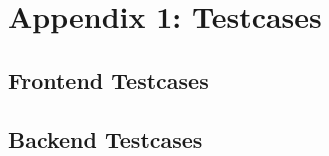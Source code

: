 \chapter{Appendix 1: Testcases} \label{apd:testcases}

\section{Frontend Testcases} \label{sec:frontend_testcases}

\section{Backend Testcases} \label{sec:backend_testcases}
